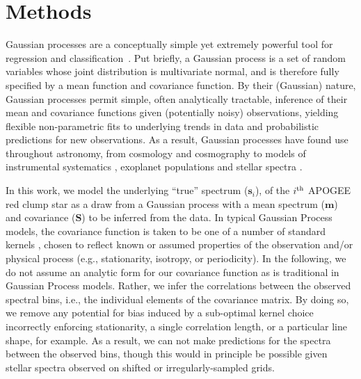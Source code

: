 \documentclass[a4paper,fleqn,usenatbib]{mnras}
\newcommand{\specmean}{{\bm m}}
\newcommand{\speccov}{{\bm S}}
\newcommand{\objspec}{{\bm s}}
\begin{document}
\section{Methods}
\label{sec:methods}

Gaussian processes are a conceptually simple yet extremely powerful tool for regression and classification~\citep{Rasmussen_Williams}. Put briefly, a Gaussian process is a set of random variables whose joint distribution is multivariate normal, and is therefore fully specified by a mean function and covariance function. By their (Gaussian) nature, Gaussian processes permit simple, often analytically tractable, inference of their mean and covariance functions given (potentially noisy) observations, yielding flexible non-parametric fits to underlying trends in data and probabilistic predictions for new observations. As a result, Gaussian processes have found use throughout astronomy, from cosmology \citep{Bond_etal:1987} and cosmography \citep{Shafieloo_etal:2012} to models of instrumental systematics \citep{Gibson_etal:2012}, exoplanet populations \citep{DFM_etal:2014} and stellar spectra \citep{Czekala_etal:2017}.

In this work, we model the underlying ``true'' spectrum ($\objspec_i$), of the $i^{\rm th}$ APOGEE red clump star as a draw from a Gaussian process with a mean spectrum ($\specmean$) and covariance ($\speccov$) to be inferred from the data. In typical Gaussian Process models, the covariance function is taken to be one of a number of standard kernels \citep{Rasmussen_Williams}, chosen to reflect known or assumed properties of the observation and/or physical process (e.g., stationarity, isotropy, or periodicity). In the following, we do not assume an analytic form for our covariance function as is traditional in Gaussian Process models. Rather, we infer the correlations between the observed spectral bins, i.e., the individual elements of the covariance matrix. By doing so, we remove any potential for bias induced by a sub-optimal kernel choice incorrectly enforcing stationarity, a single correlation length, or a particular line shape, for example. As a result, we can not make predictions for the spectra between the observed bins, though this would in principle be possible given stellar spectra observed on shifted or irregularly-sampled grids.
\end{document}
